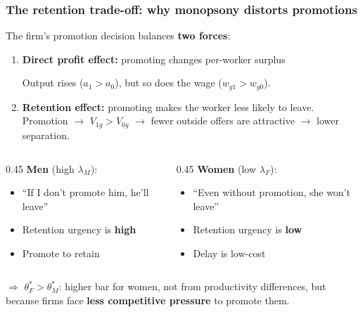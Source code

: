 \documentclass[aspectratio=169, 11pt]{beamer}
\begin{document}
\begin{frame}[label=retentionslide]
\frametitle{The retention trade-off: why monopsony distorts promotions}

The firm's promotion decision balances \textbf{two forces}:

\vspace{0.1cm}
\begin{enumerate}
    \item \textbf{Direct profit effect:} promoting changes per-worker surplus

    Output rises ($a_1 > a_0$), but so does the wage ($w_{g1} > w_{g0}$). %
    \bigskip
    \item \textbf{Retention effect:} promoting makes the worker less likely to leave. Promotion $\to$ $V_{1g} > V_{0g}$ $\to$ fewer outside offers are attractive $\to$ lower separation. %
\end{enumerate}

\vspace{0.1cm}
\begin{columns}[T]
    \begin{column}{0.45\textwidth}
        \textbf{Men} (high $\lambda_M$):
        \begin{itemize}
            \item ``If I don't promote him, he'll leave''
            \item Retention urgency is \textbf{high}
            \item[$\Rightarrow$] Promote to retain
        \end{itemize}
    \end{column}
    \begin{column}{0.45\textwidth}
        \textbf{Women} (low $\lambda_F$):
        \begin{itemize}
            \item ``Even without promotion, she won't leave''
            \item Retention urgency is \textbf{low}
            \item[$\Rightarrow$] Delay is low-cost
        \end{itemize}
    \end{column}
\end{columns}

\vspace{0.3cm}
$\Rightarrow$ $\theta_F^* > \theta_M^*$: higher bar for women, not from productivity differences, but because firms face \textbf{less competitive pressure} to promote them.
\hfill\hyperlink{foc-formal}{}

\end{frame}
\end{document}
